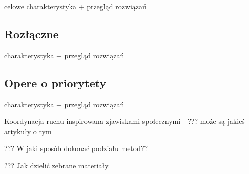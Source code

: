 celowe
charakterystyka + przegląd rozwiązań 

\subsection{Rozłączne}

charakterystyka + przegląd rozwiązań 

\subsection{Opere o priorytety}

charakterystyka + przegląd rozwiązań 



Koordynacja ruchu inspirowana zjawiskami społecznymi - ??? może są jakieś artykuły o tym 

??? W jaki sposób dokonać podziału metod??

??? Jak dzielić zebrane materiały.